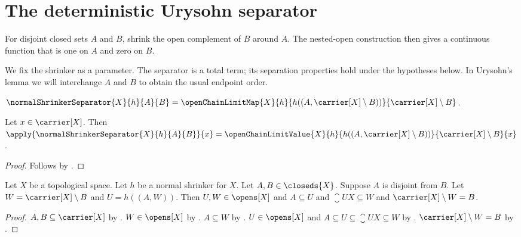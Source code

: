 

\section{The deterministic Urysohn separator}

For disjoint closed sets $A$ and $B$, shrink the open complement of $B$
around $A$. The nested-open construction then gives a continuous function
that is one on $A$ and zero on $B$.

We fix the shrinker as a parameter. The separator is a total term; its
separation properties hold under the hypotheses below. In Urysohn's lemma
we will interchange $A$ and $B$ to obtain the usual endpoint order.

\begin{definition}\label{normal_shrinker_separator}
    $\normalShrinkerSeparator{X}{h}{A}{B}
        =\openChainLimitMap{X}{h}
            {h((A,\carrier[X]\setminus B))}
            {\carrier[X]\setminus B}$.
\end{definition}

\begin{proposition}\label{normal_shrinker_separator_apply}
    Let $x\in\carrier[X]$.
    Then
        $\apply{\normalShrinkerSeparator{X}{h}{A}{B}}{x}
            =\openChainLimitValue{X}{h}
                {h((A,\carrier[X]\setminus B))}
                {\carrier[X]\setminus B}{x}$.
\end{proposition}
\begin{proof}
    Follows by
        .
\end{proof}

\begin{proposition}\label{normal_shrinker_separator_open_data}
    Let $X$ be a topological space.
    Let $h$ be a normal shrinker for $X$.
    Let $A,B\in\closeds{X}$.
    Suppose $A$ is disjoint from $B$.
    Let $W=\carrier[X]\setminus B$ and $U=h((A,W))$.
    Then $U,W\in\opens[X]$ and
        $A\subseteq U$ and $\closure{U}{X}\subseteq W$ and
        $\carrier[X]\setminus W=B$.
\end{proposition}
\begin{proof}
    $A,B\subseteq\carrier[X]$ by .
    $W\in\opens[X]$ by .
    $A\subseteq W$ by .
    $U\in\opens[X]$ and
        $A\subseteq U\subseteq\closure{U}{X}\subseteq W$
        by .
    $\carrier[X]\setminus W=B$
        by .
\end{proof}

